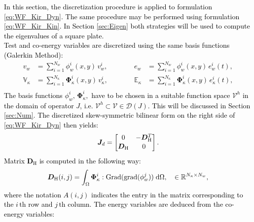 \documentclass[11pt]{article}
\newcommand{\revTwo}[1]{\textcolor{black}{#1}}
\begin{document}
	\revTwo{
		In this section, the discretization procedure is applied to formulation \eqref{eq:WF_Kir_Dyn}. The same procedure may be performed using formulation \eqref{eq:WF_Kir_Kin}. In Section \ref{sec:Eigen} both strategies will be used to compute the eigenvalues of a square plate. \\
		Test and co-energy variables are discretized using the same basis functions (Galerkin Method):
		\begin{equation}
		\begin{aligned}
		v_w &= \sum_{i = 1}^{N_w} \phi_w^i(x,y) \, v_w^i, \\
		\mathbb{V}_\kappa &= \sum_{i = 1}^{N_\kappa} \bm\Phi_\kappa^i(x,y) \, v_\kappa^i,\\
		\end{aligned} \qquad \quad
		\begin{aligned}
		e_w &= \sum_{i = 1}^{N_w} \phi_w^i(x,y) \, e_w^i(t), \\
		\mathbb{E}_\kappa &= \sum_{i = 1}^{N_\kappa} \bm\Phi_\kappa^i(x,y) \, e_\kappa^i(t),\\
		\end{aligned}
		\end{equation}
		The basis functions $\phi_w^i, \, \bm\Phi_\kappa^i, $ have to be chosen in a suitable function space $\mathcal{V}^h$ in the domain of operator $J$, i.e. $\mathcal{V}^h \subset \mathcal{V} \in \mathcal{D}(J)$. This will be discussed in Section \ref{sec:Num}. The discretized skew-symmetric bilinear form on the right side of \eqref{eq:WF_Kir_Dyn} then yields:
		\begin{equation}
		\bm{J}_d = 
		\begin{bmatrix}
		0 & -\bm{D}_{\mathrm{H}}^T \vspace{.3mm}\\
		\bm{D}_{\mathrm{H}} & 0 \vspace{.3mm}\\
		\end{bmatrix}.
		\end{equation}
		Matrix $\bm{D}_{\mathrm{H}}$ is computed in the following way:
		\begin{equation}
		\bm{D}_{\mathrm{H}}(i,j) = \int_{\Omega} \bm{\Phi}_{\kappa}^i : \mathrm{Grad}(\mathrm{grad}(\phi_w^j)) \d\Omega, \quad \in \mathbb{R}^{N_\kappa \times N_w},
		\end{equation}
		where the notation $A(i,j)$ indicates the entry in the matrix corresponding to the $i \, {\text{th}}$ row and $j \,{\text{th}}$ column. The energy variables are deduced from the co-energy variables: 
}
\end{document}
